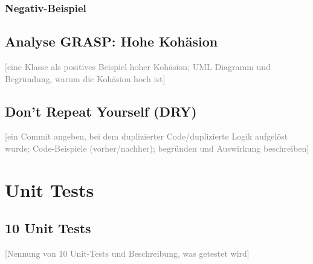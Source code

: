 \documentclass[a4paper,12pt]{article}
\newcommand{\placeholder}[1]{\textcolor{gray}{[#1]}}
\begin{document}
\subsubsection*{Negativ-Beispiel}

\bigskip

\subsection*{Analyse GRASP: Hohe Kohäsion}

\placeholder{eine Klasse als positives Beispiel hoher Kohäsion; UML Diagramm und Begründung, warum
    die Kohäsion hoch ist}

\subsection*{Don't Repeat Yourself (DRY)}

\placeholder{ein Commit angeben, bei dem duplizierter Code/duplizierte Logik aufgelöst wurde;
    Code-Beispiele (vorher/nachher); begründen und Auswirkung beschreiben}

\newpage
\section{Unit Tests}

\subsection*{10 Unit Tests}

\placeholder{Nennung von 10 Unit-Tests und Beschreibung, was getestet wird}
\end{document}
